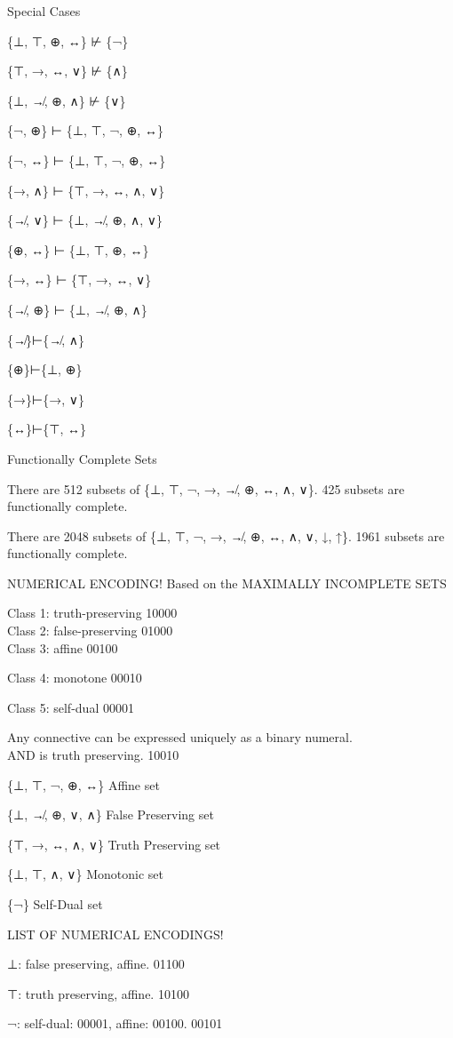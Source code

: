 \protect\hypertarget{anchor-30}{}{}Special Cases

\{⊥, ⊤, ⊕, ↔\} ⊬ \{¬\}

\{⊤, →, ↔, ∨\} ⊬ \{∧\}

\{⊥, ↛, ⊕, ∧\} ⊬ \{∨\}

\{¬, ⊕\} ⊢ \{⊥, ⊤, ¬, ⊕, ↔\}

\{¬, ↔\} ⊢ \{⊥, ⊤, ¬, ⊕, ↔\}

\{→, ∧\} ⊢ \{⊤, →, ↔, ∧, ∨\}

\{↛, ∨\} ⊢ \{⊥, ↛, ⊕, ∧, ∨\}

\{⊕, ↔\} ⊢ \{⊥, ⊤, ⊕, ↔\}

\{→, ↔\} ⊢ \{⊤, →, ↔, ∨\}

\{↛, ⊕\} ⊢ \{⊥, ↛, ⊕, ∧\}

\{↛\}⊢\{↛, ∧\}

\{⊕\}⊢\{⊥, ⊕\}

\{→\}⊢\{→, ∨\}

\{↔\}⊢\{⊤, ↔\}

\protect\hypertarget{anchor-31}{}{}Functionally Complete Sets

There are 512 subsets of \{⊥, ⊤, ¬, →, ↛, ⊕, ↔, ∧, ∨\}. 425 subsets are
functionally complete.

There are 2048 subsets of \{⊥, ⊤, ¬, →, ↛, ⊕, ↔, ∧, ∨, ↓, ↑\}. 1961
subsets are functionally complete.

NUMERICAL ENCODING! Based on the MAXIMALLY INCOMPLETE SETS

Class 1: truth-preserving 10000\\
Class 2: false-preserving 01000\\
Class 3: affine 00100

Class 4: monotone 00010

Class 5: self-dual 00001

Any connective can be expressed uniquely as a binary numeral.\\
AND is truth preserving. 10010

\{⊥, ⊤, ¬, ⊕, ↔\} Affine set

\{⊥, ↛, ⊕, ∨, ∧\} False Preserving set

\{⊤, →, ↔, ∧, ∨\} Truth Preserving set

\{⊥, ⊤, ∧, ∨\} Monotonic set

\{¬\} Self-Dual set

LIST OF NUMERICAL ENCODINGS!

⊥: false preserving, affine. 01100

⊤: truth preserving, affine. 10100

¬: self-dual: 00001, affine: 00100. 00101

